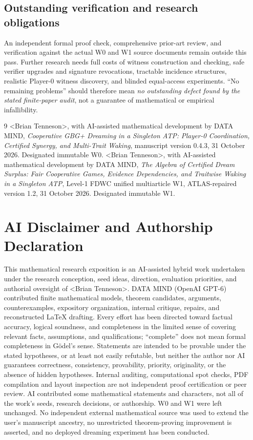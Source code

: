 \documentclass[10pt,letterpaper]{article}
\theoremstyle{definition}
\theoremstyle{remark}
\newcommand{\authorname}{\textless{}Brian Tenneson\textgreater{}}
\begin{document}
\subsection{Outstanding verification and research obligations}
An independent formal proof check, comprehensive prior-art review, and verification against the actual W0 and W1 source documents remain outside this pass. Further research needs full costs of witness construction and checking, safe verifier upgrades and signature revocations, tractable incidence structures, realistic Player-0 witness discovery, and blinded equal-access experiments. ``No remaining problems'' should therefore mean \emph{no outstanding defect found by the stated finite-paper audit}, not a guarantee of mathematical or empirical infallibility.

\begin{thebibliography}{9}
\authorname{}, with AI-assisted mathematical development by DATA MIND, \emph{Cooperative GBG+ Dreaming in a Singleton ATP: Player-0 Coordination, Certified Synergy, and Multi-Trait Waking}, manuscript version 0.4.3, 31 October 2026. Designated immutable W0.
\authorname{}, with AI-assisted mathematical development by DATA MIND, \emph{The Algebra of Certified Dream Surplus: Fair Cooperative Games, Evidence Dependencies, and Traitwise Waking in a Singleton ATP}, Level-1 FDWC unified multiarticle W1, ATLAS-repaired version 1.2, 31 October 2026. Designated immutable W1.
\end{thebibliography}

\clearpage
\section*{AI Disclaimer and Authorship Declaration}
This mathematical research exposition is an AI-assisted hybrid work undertaken under the research conception, seed ideas, direction, evaluation priorities, and authorial oversight of \authorname{}. DATA MIND (OpenAI GPT-6) contributed finite mathematical models, theorem candidates, arguments, counterexamples, expository organization, internal critique, repairs, and reconstructed \LaTeX{} drafting. Every effort has been directed toward factual accuracy, logical soundness, and completeness in the limited sense of covering relevant facts, assumptions, and qualifications; ``complete'' does not mean formal completeness in G\"odel's sense. Statements are intended to be provable under the stated hypotheses, or at least not easily refutable, but neither the author nor AI guarantees correctness, consistency, provability, priority, originality, or the absence of hidden hypotheses. Internal auditing, computational spot checks, PDF compilation and layout inspection are not independent proof certification or peer review. AI contributed some mathematical statements and characters, not all of the work's seeds, research decisions, or authorship. W0 and W1 were left unchanged. No independent external mathematical source was used to extend the user's manuscript ancestry, no unrestricted theorem-proving improvement is asserted, and no deployed dreaming experiment has been conducted.
\end{document}
